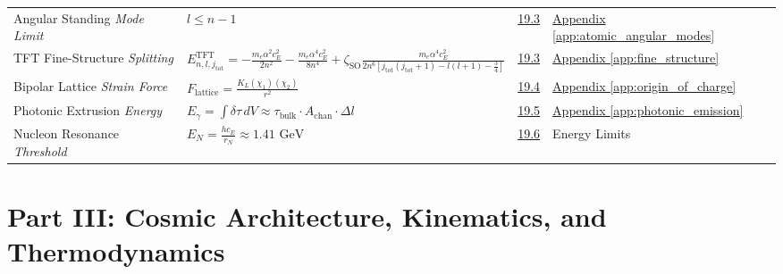 \begin{longtable}{@{} p{4.5cm} p{6cm} c p{4cm} @{}}
Angular Standing \newline \textit{Mode Limit} & $l \le n-1$ & \hyperref[sec:19.3]{19.3} & \hyperref[app:atomic_angular_modes]{Appendix \ref*{app:atomic_angular_modes}} \\

TFT Fine-Structure \newline \textit{Splitting} & $E_{n,l,j_{\text{tot}}}^{\text{TFT}} = -\frac{m_e \alpha^2 c_E^2}{2n^2} - \frac{m_e \alpha^4 c_E^2}{8n^4} + \zeta_{\text{SO}} \frac{m_e \alpha^4 c_E^2}{2n^6 \left[j_{\text{tot}}(j_{\text{tot}}+1) - l(l+1) - \frac{3}{4}\right]}$ & \hyperref[sec:19.3]{19.3} & \hyperref[app:fine_structure]{Appendix \ref*{app:fine_structure}} \\

Bipolar Lattice \newline \textit{Strain Force} & $F_{\text{lattice}} = \frac{K_L (\chi_1)(\chi_2)}{r^2}$ & \hyperref[sec:19.4]{19.4} & \hyperref[app:origin_of_charge]{Appendix \ref*{app:origin_of_charge}} \\

Photonic Extrusion \newline \textit{Energy} & $E_\gamma = \int \delta\tau \, dV \approx \tau_{\text{bulk}} \cdot A_{\text{chan}} \cdot \Delta l$ & \hyperref[sec:19.5]{19.5} & \hyperref[app:photonic_emission]{Appendix \ref*{app:photonic_emission}} \\

Nucleon Resonance \newline \textit{Threshold} & $E_N = \frac{hc_E}{r_N} \approx 1.41 \text{ GeV}$ & \hyperref[sec:19.6]{19.6} & Energy Limits \\

\bottomrule
\end{longtable}

\newpage %

\section*{Part III: Cosmic Architecture, Kinematics, and Thermodynamics}

